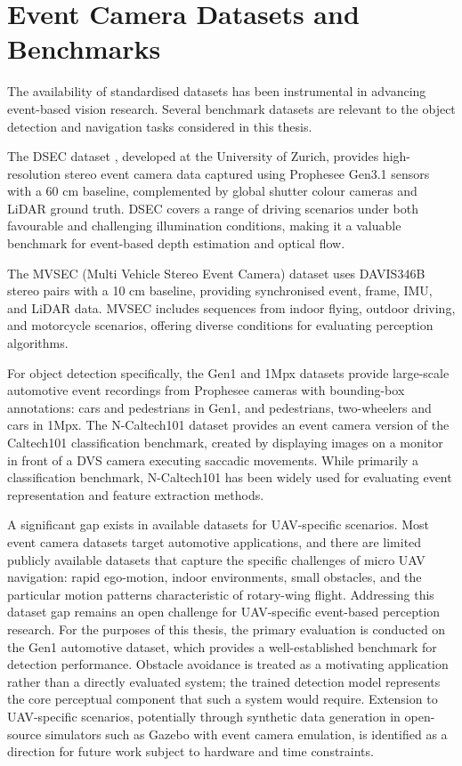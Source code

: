 \documentclass[11pt, a4paper]{report}
\begin{document}
\section{Event Camera Datasets and Benchmarks}
The availability of standardised datasets has been instrumental in advancing event-based vision research. Several benchmark datasets are relevant to the object detection and navigation tasks considered in this thesis. 

The DSEC dataset \cite{gehrig2021dsec}, developed at the University of Zurich, provides high-resolution stereo event camera data captured using Prophesee Gen3.1 sensors with a 60 cm baseline, complemented by global shutter colour cameras and LiDAR ground truth. DSEC covers a range of driving scenarios under both favourable and challenging illumination conditions, making it a valuable benchmark for event-based depth estimation and optical flow. 

The MVSEC (Multi Vehicle Stereo Event Camera) dataset \cite{zhu2018multivehicle} uses DAVIS346B stereo pairs with a 10 cm baseline, providing synchronised event, frame, IMU, and LiDAR data. MVSEC includes sequences from indoor flying, outdoor driving, and motorcycle scenarios, offering diverse conditions for evaluating perception algorithms. 

For object detection specifically, the Gen1 \cite{detournemire2020large} and 1Mpx \cite{perot2020learning} datasets provide large-scale automotive event recordings from Prophesee cameras with bounding-box annotations: cars and pedestrians in Gen1, and pedestrians, two-wheelers and cars in 1Mpx. The N-Caltech101 dataset \cite{orchard2015converting} provides an event camera version of the Caltech101 classification benchmark, created by displaying images on a monitor in front of a DVS camera executing saccadic movements. While primarily a classification benchmark, N-Caltech101 has been widely used for evaluating event representation and feature extraction methods. 

A significant gap exists in available datasets for UAV-specific scenarios. Most event camera datasets target automotive applications, and there are limited publicly available datasets that capture the specific challenges of micro UAV navigation: rapid ego-motion, indoor environments, small obstacles, and the particular motion patterns characteristic of rotary-wing flight. Addressing this dataset gap remains an open challenge for UAV-specific event-based perception research. For the purposes of this thesis, the primary evaluation is conducted on the Gen1 automotive dataset, which provides a well-established benchmark for detection performance. Obstacle avoidance is treated as a motivating application rather than a directly evaluated system; the trained detection model represents the core perceptual component that such a system would require. Extension to UAV-specific scenarios, potentially through synthetic data generation in open-source simulators such as Gazebo with event camera emulation, is identified as a direction for future work subject to hardware and time constraints. 
\end{document}
